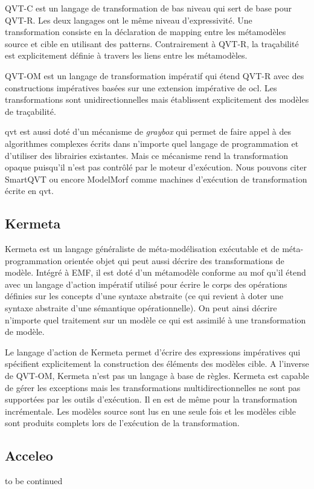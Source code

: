 QVT-C est un langage de transformation de bas niveau qui sert de base pour 
QVT-R. Les deux langages ont le même niveau d'expressivité. Une transformation consiste 
en la déclaration de mapping entre les métamodèles source et cible en utilisant 
des patterns. Contrairement à QVT-R, la traçabilité est explicitement définie à 
travers les liens entre les métamodèles.

QVT-OM est un langage de transformation impératif qui étend QVT-R avec des 
constructions impératives basées sur une extension impérative de \gls{ocl}. Les 
transformations sont unidirectionnelles mais établissent explicitement des 
modèles de traçabilité.

\gls{qvt} est aussi doté d'un mécanisme de \textit{graybox} qui permet de faire appel 
à des algorithmes complexes écrits dans n'importe quel langage de programmation 
et d'utiliser des librairies existantes. Mais ce mécanisme rend la transformation opaque puisqu'il n'est pas contrôlé par le moteur d'exécution. 
Nous pouvons citer SmartQVT ou encore ModelMorf comme machines d'exécution de 
transformation écrite en \gls{qvt}.

\subsection{Kermeta}
Kermeta est un langage généraliste de méta-modélisation exécutable et de 
méta-programmation orientée objet qui peut aussi décrire des transformations de 
modèle. Intégré à EMF, il est doté d'un métamodèle conforme au \gls{mof} qu'il étend 
avec un langage d'action impératif utilisé pour écrire le corps des opérations 
définies sur les concepts d'une syntaxe abstraite (ce qui revient à doter une 
syntaxe abstraite d'une sémantique opérationnelle). On peut ainsi décrire 
n'importe quel traitement sur un modèle ce qui est assimilé à une transformation 
de modèle.

Le langage d'action de Kermeta permet d'écrire des expressions impératives qui 
spécifient explicitement la construction des éléments des modèles cible. A 
l'inverse de QVT-OM, Kermeta n'est pas un langage à base de règles.  
Kermeta est capable de gérer les exceptions mais les transformations 
multidirectionnelles ne sont pas supportées par les outils d'exécution. Il en 
est de même pour la transformation incrémentale. Les modèles source sont lus en 
une seule fois et les modèles cible sont produits complets lors de l'exécution 
de la transformation.

\subsection{Acceleo}
to be continued


